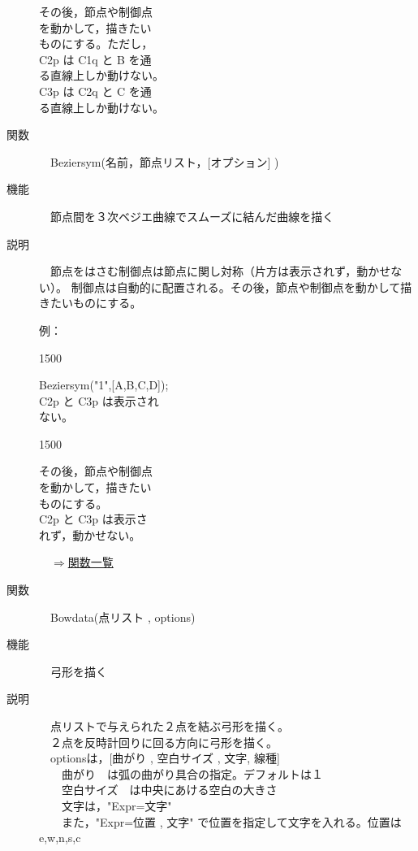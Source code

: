 \documentclass[papersize,a4paper,12pt,uplatex]{jsarticle}
\begin{document}
\begin{description}
その後，節点や制御点\\
を動かして，描きたい\\
ものにする。ただし，\\
C2p は C1q と B を通\\
る直線上しか動けない。\\
C3p は C2q と C を通\\
る直線上しか動けない。

\vspace{10mm}


\hypertarget{beziersym}{}
\item[関数]　Beziersym(名前，節点リスト，[オプション] )
\item[機能]　節点間を３次ベジエ曲線でスムーズに結んだ曲線を描く
\item[説明]　節点をはさむ制御点は節点に関し対称（片方は表示されず，動かせない）。
制御点は自動的に配置される。その後，節点や制御点を動かして描きたいものにする。

例：

\begin{layer}{150}{0}
\end{layer}

Beziersym("1",[A,B,C,D]);\\
C2p と C3p は表示され\\
ない。

\vspace{10mm}

\begin{layer}{150}{0}
\end{layer}

その後，節点や制御点\\
を動かして，描きたい\\
ものにする。\\
C2p と C3p は表示さ\\れず，動かせない。
　\\
\begin{flushright}　\hyperlink{functionlist}{$\Rightarrow$関数一覧}\end{flushright}

\hypertarget{bowdata}{}
\item[関数]　Bowdata(点リスト , options)
\item[機能]　弓形を描く
\item[説明]　点リストで与えられた２点を結ぶ弓形を描く。\\
　２点を反時計回りに回る方向に弓形を描く。\\
　optionsは，[曲がり , 空白サイズ  , 文字, 線種]\\
　　曲がり　は弧の曲がり具合の指定。デフォルトは１\\
　　空白サイズ　は中央にあける空白の大きさ\\
　　文字は，"Expr=文字" \\
　　また，"Expr=位置 , 文字"  で位置を指定して文字を入れる。位置はe,w,n,s,c\\


\end{description}
\end{document}
